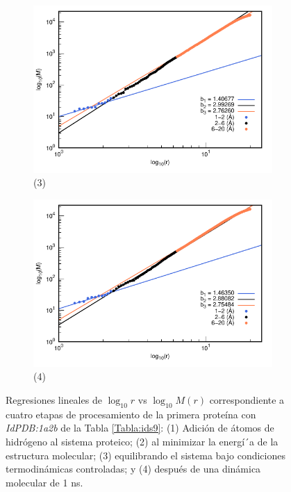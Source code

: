 \begin{figure}[H]
	\vspace{0cm} %
	
	\hspace{-0.3cm} 
	\begin{subfigure}{0.49\textwidth}
		\centering
		\includegraphics[width=\linewidth,page=1]{graphs/PDBs/1a2b/1a2bEq.pdf}
		\caption{(3)}
	\end{subfigure}
	\hspace{0.2cm}
	\begin{subfigure}{0.49\textwidth} %
		\centering
		\includegraphics[width=\linewidth,page=1]{graphs/PDBs/1a2b/1a2b1ns.pdf}
		\caption{(4)}
	\end{subfigure}
	
	\caption{
		Regresiones lineales de $\log_{10}r$ vs $\log_{10}M(r)$ correspondiente a cuatro etapas de procesamiento de la primera prote\'{i}na con \textit{IdPDB:1a2b} de la Tabla \ref{Tabla:ids9}: (1) Adici\'{o}n de \'{a}tomos de hidr\'{o}geno al sistema proteico; (2) al minimizar la energ\'{i´}a de la estructura molecular; (3) equilibrando el sistema bajo condiciones termodin\'{a}micas controladas; y (4) despu\'{e}s de una din\'{a}mica molecular de 1 ns.}
	\label{fig:1a2b}
\end{figure}

